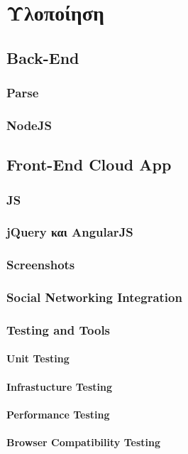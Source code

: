 \chapter{Υλοποίηση}\label{ch:Implementation}
\section{Back-End}
	\subsection{Parse}
	\subsection{NodeJS}
		
\section{Front-End Cloud App}
	\subsection{JS}
	\subsection{jQuery και AngularJS}
	\subsection{Screenshots}
	\subsection{Social Networking Integration}
	\subsection{Testing and Tools}
		\subsubsection{Unit Testing}
		\subsubsection{Infrastucture Testing}
		\subsubsection{Performance Testing}
		\subsubsection{Browser Compatibility Testing}

